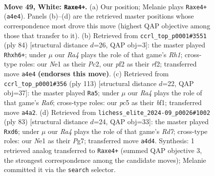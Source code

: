 \documentclass[11pt]{article}
\begin{document}
\clearpage

\begin{figure}[p]\centering
\begin{subfigure}{0.46\textwidth}\centering
\resizebox{\linewidth}{!}{%
\newchessgame
\chessboard[
  setfen={8/4R3/8/2p4P/R3pk2/8/1P3p2/3KN2r w - - 2 49},
  showmover=false,
  pgfstyle=straightmove, color=movearrow, markmove={a4-e4}
]}
\caption{}
\end{subfigure}\hfill
\begin{subfigure}{0.46\textwidth}\centering
\resizebox{\linewidth}{!}{%
\newchessgame
\chessboard[
  setfen={2r5/1p5k/p2R3p/8/8/P7/2P2r2/1K5R w - - 6 43},
  showmover=false,
  pgfstyle=straightmove, color=movearrow, markmove={h1-h6}
]}
\caption{}
\end{subfigure}
\\[4pt]
\begin{subfigure}{0.46\textwidth}\centering
\resizebox{\linewidth}{!}{%
\newchessgame
\chessboard[
  setfen={8/p7/P1kn2R1/6p1/8/r4PK1/8/5B2 b - - 15 57},
  showmover=false,
  pgfstyle=straightmove, color=movearrow, markmove={a3-a5}
]}
\caption{}
\end{subfigure}\hfill
\begin{subfigure}{0.46\textwidth}\centering
\resizebox{\linewidth}{!}{%
\newchessgame
\chessboard[
  setfen={6R1/6p1/P2P4/4p3/4P1k1/8/3r2PK/8 b - - 3 42},
  showmover=false,
  pgfstyle=straightmove, color=movearrow, markmove={d2-d6}
]}
\caption{}
\end{subfigure}
\caption{\textbf{Move 49, White: \texttt{Raxe4+}.} (a) Our position; Melanie plays \texttt{Raxe4+} (\texttt{a4e4}). Panels (b)--(d) are the retrieved master positions whose correspondence most drove this move (highest QAP objective among those that transfer to it). (b) Retrieved from \texttt{ccrl\_top\_p0001\#3551} (ply 84) [structural distance $d$=26, QAP obj=3]: the master played \texttt{Rhxh6+}; under $\mu$ our \emph{Ra4} plays the role of that game's \emph{Rh1}; cross-type roles: our \emph{N}e1 as their \emph{P}c2, our \emph{p}f2 as their \emph{r}f2; transferred move \texttt{a4e4} \textbf{(endorses this move)}. (c) Retrieved from \texttt{ccrl\_top\_p0001\#356} (ply 113) [structural distance $d$=22, QAP obj=37]: the master played \texttt{Ra5}; under $\mu$ our \emph{Ra4} plays the role of that game's \emph{Ra6}; cross-type roles: our \emph{p}c5 as their \emph{b}f1; transferred move \texttt{a4a2}. (d) Retrieved from \texttt{lichess\_elite\_2024-09\_p0026\#1002} (ply 83) [structural distance $d$=24, QAP obj=33]: the master played \texttt{Rxd6}; under $\mu$ our \emph{Ra4} plays the role of that game's \emph{Rd7}; cross-type roles: our \emph{N}e1 as their \emph{P}g7; transferred move \texttt{a4d4}. Synthesis: 1 retrieved analog transferred to \texttt{Raxe4+} (summed QAP objective 3, the strongest correspondence among the candidate moves); Melanie committed it via the \texttt{search} selector.}
\label{fig:thought-m96}
\end{figure}
\end{document}
